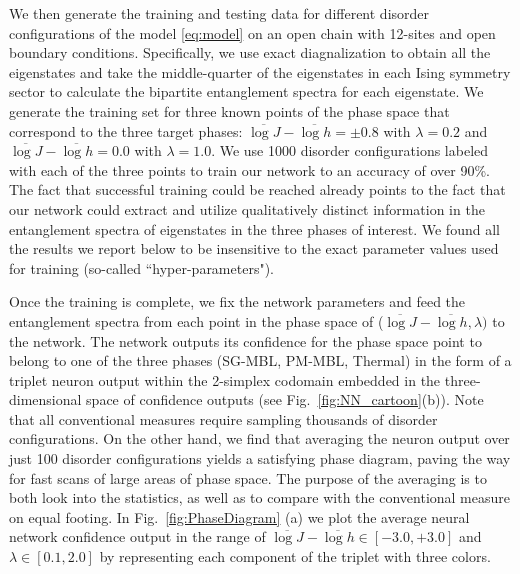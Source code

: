 \documentclass[amsmath,amssymb, aps, prb, superscriptaddress,twocolumn]{revtex4-1}
\begin{document}
We then generate the training and testing data for different disorder configurations of the model \eqref{eq:model} on an open chain with 12-sites and open boundary conditions. Specifically, we use exact diagnalization to obtain all the eigenstates and take the middle-quarter of the eigenstates in each Ising symmetry sector to calculate the bipartite entanglement spectra for each eigenstate. 
We generate the training set for three known points of the phase space that correspond to the three target phases: $\overline{\log J} - \overline{\log h} = \pm 0.8$ with $\lambda =0.2$ and $\overline{\log J} - \overline{\log h} = 0.0$ with $\lambda = 1.0$. We use 1000 disorder configurations labeled with each of the three points to train our network to an accuracy of over 90\%. The fact that successful training could be reached already points to the fact that our network could extract and utilize qualitatively distinct information in the entanglement spectra of eigenstates in the three phases of interest.
We found all the results we report below to be insensitive to the exact parameter values used for training (so-called ``hyper-parameters").

Once the training is complete, we fix the network parameters and feed the entanglement spectra from each point in the phase space of ($\overline{\log J} - \overline{\log h}, \lambda)$ to the network. The network outputs its confidence for the phase space point to belong to one of the three phases (SG-MBL, PM-MBL, Thermal) in the form of a triplet neuron output within the 2-simplex codomain embedded in the three-dimensional space of confidence outputs (see Fig.~\ref{fig:NN_cartoon}(b)). Note that all conventional measures require sampling thousands of disorder configurations. On the other hand, we find that averaging the neuron output over just 100 disorder configurations yields a satisfying phase diagram, paving the way for fast scans of large areas of phase space. The purpose of the averaging is to both look into the statistics, as well as to compare with the conventional measure on equal footing. In Fig.~\ref{fig:PhaseDiagram} (a) we plot the average neural network confidence output in the range of $\overline{\log J} - \overline{\log h} \in [ -3.0, +3.0]$ and $\lambda \in [0.1, 2.0 ]$ by representing each component of the triplet with three colors.  
\end{document}
